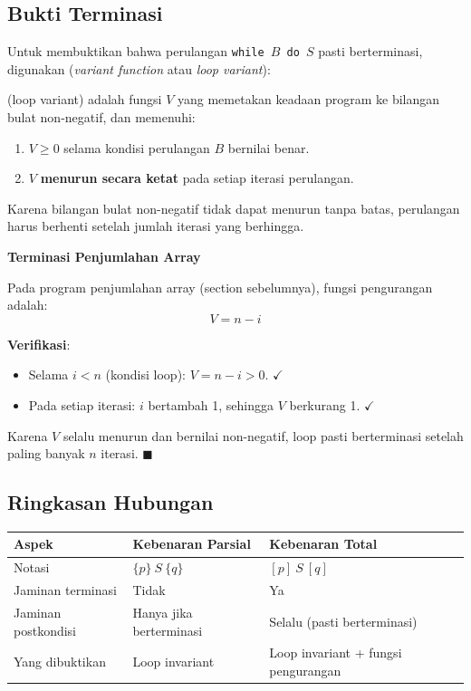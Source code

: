 \subsection{Bukti Terminasi}

Untuk membuktikan bahwa perulangan \texttt{while $B$ do $S$} pasti berterminasi, digunakan  (\textit{variant function} atau \textit{loop variant}):

\begin{definisi}
 (loop variant) adalah fungsi $V$ yang memetakan keadaan program ke bilangan bulat non-negatif, dan memenuhi:
\begin{enumerate}
    \item $V \geq 0$ selama kondisi perulangan $B$ bernilai benar.
    \item $V$ \textbf{menurun secara ketat} pada setiap iterasi perulangan.
\end{enumerate}
Karena bilangan bulat non-negatif tidak dapat menurun tanpa batas, perulangan harus berhenti setelah jumlah iterasi yang berhingga.
\end{definisi}

\begin{contoh}
\textbf{Terminasi Penjumlahan Array}

Pada program penjumlahan array (section sebelumnya), fungsi pengurangan adalah:
\[ V = n - i \]

\textbf{Verifikasi}:
\begin{itemize}
    \item Selama $i < n$ (kondisi loop): $V = n - i > 0$. $\checkmark$
    \item Pada setiap iterasi: $i$ bertambah 1, sehingga $V$ berkurang 1. $\checkmark$
\end{itemize}

Karena $V$ selalu menurun dan bernilai non-negatif, loop pasti berterminasi setelah paling banyak $n$ iterasi. $\blacksquare$
\end{contoh}

\subsection{Ringkasan Hubungan}

\begin{center}
\renewcommand{\arraystretch}{1.3}
\begin{tabular}{|p{4cm}|p{4cm}|p{4.5cm}|}
\hline
\textbf{Aspek} & \textbf{Kebenaran Parsial} & \textbf{Kebenaran Total} \\ \hline
Notasi & $\{p\}\ S\ \{q\}$ & $[p]\ S\ [q]$ \\ \hline
Jaminan terminasi & Tidak & Ya \\ \hline
Jaminan postkondisi & Hanya jika berterminasi & Selalu (pasti berterminasi) \\ \hline
Yang dibuktikan & Loop invariant & Loop invariant + fungsi pengurangan \\ \hline
\end{tabular}
\end{center}
